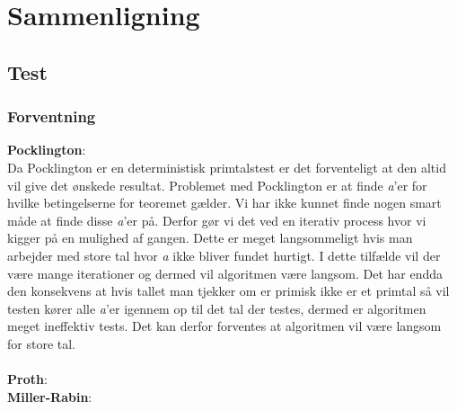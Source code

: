 \documentclass[12pt]{article}
\author{Nikolaj Dybdahl Rathcke}
\begin{document}
\section{Sammenligning}
\subsection*{Test}

\subsubsection*{Forventning}
\textbf{Pocklington}:\\
Da Pocklington er en deterministisk primtalstest er det forventeligt at den altid vil give det ønskede resultat.
Problemet med Pocklington er at finde \textit{a}'er for hvilke betingelserne for teoremet gælder. Vi har ikke kunnet
finde nogen smart måde at finde disse \textit{a}'er på. Derfor gør vi det ved en iterativ process hvor vi kigger på en mulighed
af gangen. Dette er meget langsommeligt hvis man arbejder med store tal hvor \textit{a} ikke bliver fundet hurtigt. I
dette tilfælde vil der være mange iterationer og dermed vil algoritmen være langsom.
Det har endda den konsekvens at hvis tallet man tjekker om er primisk ikke er et primtal så vil testen kører alle \textit{a}'er igennem op til det tal der testes, dermed er algoritmen meget ineffektiv tests. Det kan derfor forventes at algoritmen vil
være langsom for store tal.\\\\
\textbf{Proth}:\\

\textbf{Miller-Rabin}:\\
\end{document}
